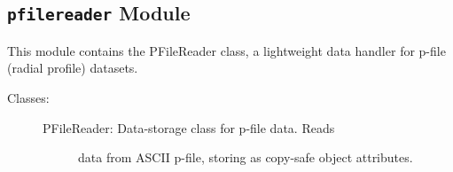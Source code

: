 \documentclass[letterpaper,10pt,english]{sphinxmanual}
\begin{document}
\subsection{\texttt{pfilereader} Module}
\label{eqtools:pfilereader-module}\label{eqtools:module-eqtools.pfilereader}
This module contains the PFileReader class, a lightweight data
handler for p-file (radial profile) datasets.
\begin{description}
\item[{Classes:}] \leavevmode\begin{description}
\item[{PFileReader: Data-storage class for p-file data.  Reads}] \leavevmode
data from ASCII p-file, storing as copy-safe object
attributes.

\end{description}

\end{description}
\end{document}
